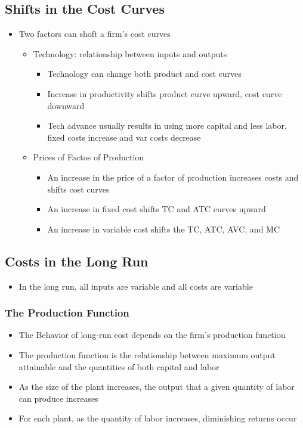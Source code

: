 \documentclass[11pt]{article}
\begin{document}
\subsection{Shifts in the Cost Curves}
\label{sec:org657cb94}
\begin{itemize}
\item Two factors can shoft a firm's cost curves
\begin{itemize}
\item Technology: relationship between inputs and outputs
\begin{itemize}
\item Technology can change both product and cost curves
\item Increase in productivity shifts product curve upward, cost curve downward
\item Tech advance usually results in using more capital and less labor, fixed costs     increase and var costs decrease
\end{itemize}
\item Prices of Factos of Production
\begin{itemize}
\item An increase in the price of a factor of production increases costs and shifts cost curves
\item An increase in fixed cost shifts TC and ATC curves upward
\item An increase in variable cost shifts the TC, ATC, AVC, and MC
\end{itemize}
\end{itemize}
\end{itemize}
\subsection{Costs in the Long Run}
\label{sec:org64dbecf}
\begin{itemize}
\item In the long run, all inputs are variable and all costs are variable
\end{itemize}
\subsubsection{The Production Function}
\label{sec:org3b57369}
\begin{itemize}
\item The Behavior of long-run cost depends on the firm's production function
\item The production function is the relationship between maximum output attainable and the quantities of both capital and labor
\item As the size of the plant increases, the output that a given quantity of labor can produce increases
\item For each plant, as the quantity of labor increases, diminishing returns occur
\end{itemize}
\end{document}
